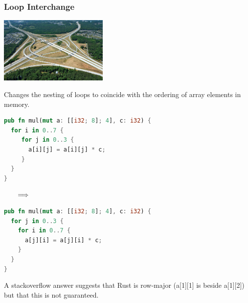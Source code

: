 \begin{frame}[fragile]
\frametitle{Loop Interchange}

\begin{center}
	\includegraphics[width=0.4\textwidth]{images/loop-interchange.jpg}
\end{center}

Changes the nesting of loops to
coincide with the ordering of array elements in memory. 


\begin{center}
\vspace*{-1em}
\begin{minipage}{.39\textwidth}
  \begin{lstlisting}[language=Rust]
pub fn mul(mut a: [[i32; 8]; 4], c: i32) {
  for i in 0..7 {
     for j in 0..3 {
       a[i][j] = a[i][j] * c;
     }
  }
}
  \end{lstlisting}
  \end{minipage} $\hspace*{2em} \Longrightarrow \hspace*{2em}$ \begin{minipage}{.4\textwidth}
  \begin{lstlisting}[language=Rust]
pub fn mul(mut a: [[i32; 8]; 4], c: i32) {
  for j in 0..3 {
    for i in 0..7 {
      a[j][i] = a[j][i] * c;
    }
  }
}
  \end{lstlisting}
  \end{minipage}
  \end{center}
  A stackoverflow answer suggests that Rust is row-major
  (a[1][1] is beside a[1][2]) but that this is not
  guaranteed.
  
\end{frame}

